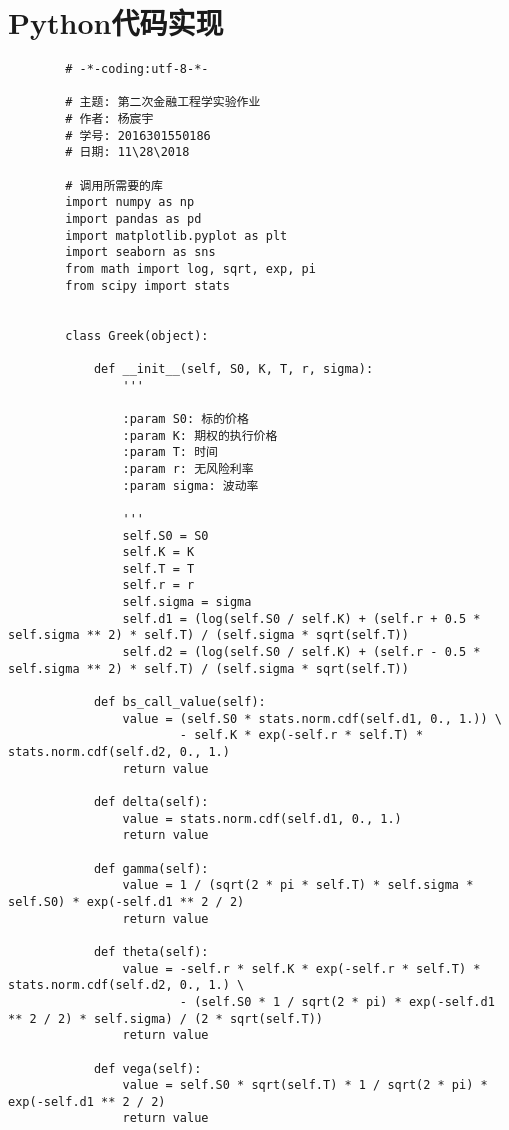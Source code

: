 \documentclass{ctexart}
\begin{document}
    \section {Python代码实现}
    \begin{lstlisting}
        # -*-coding:utf-8-*-

        # 主题: 第二次金融工程学实验作业
        # 作者: 杨宸宇
        # 学号: 2016301550186
        # 日期: 11\28\2018

        # 调用所需要的库
        import numpy as np
        import pandas as pd
        import matplotlib.pyplot as plt
        import seaborn as sns
        from math import log, sqrt, exp, pi
        from scipy import stats


        class Greek(object):

            def __init__(self, S0, K, T, r, sigma):
                '''

                :param S0: 标的价格
                :param K: 期权的执行价格
                :param T: 时间
                :param r: 无风险利率
                :param sigma: 波动率

                '''
                self.S0 = S0
                self.K = K
                self.T = T
                self.r = r
                self.sigma = sigma
                self.d1 = (log(self.S0 / self.K) + (self.r + 0.5 * self.sigma ** 2) * self.T) / (self.sigma * sqrt(self.T))
                self.d2 = (log(self.S0 / self.K) + (self.r - 0.5 * self.sigma ** 2) * self.T) / (self.sigma * sqrt(self.T))

            def bs_call_value(self):
                value = (self.S0 * stats.norm.cdf(self.d1, 0., 1.)) \
                        - self.K * exp(-self.r * self.T) * stats.norm.cdf(self.d2, 0., 1.)
                return value

            def delta(self):
                value = stats.norm.cdf(self.d1, 0., 1.)
                return value

            def gamma(self):
                value = 1 / (sqrt(2 * pi * self.T) * self.sigma * self.S0) * exp(-self.d1 ** 2 / 2)
                return value

            def theta(self):
                value = -self.r * self.K * exp(-self.r * self.T) * stats.norm.cdf(self.d2, 0., 1.) \
                        - (self.S0 * 1 / sqrt(2 * pi) * exp(-self.d1 ** 2 / 2) * self.sigma) / (2 * sqrt(self.T))
                return value

            def vega(self):
                value = self.S0 * sqrt(self.T) * 1 / sqrt(2 * pi) * exp(-self.d1 ** 2 / 2)
                return value


\end{lstlisting}
\end{document}
